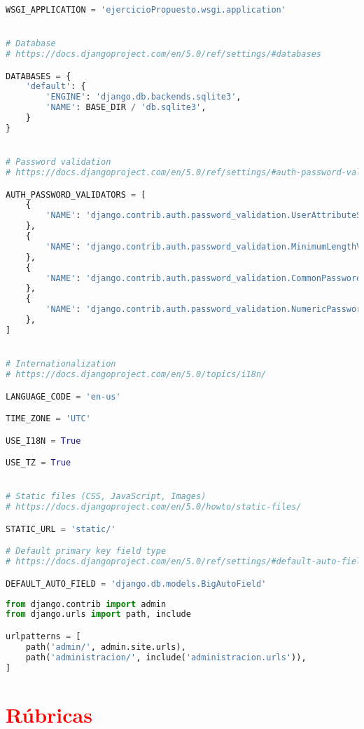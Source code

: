 \documentclass{article}
\begin{document}
\begin{lstlisting}[language=Python, caption=settings.py]
WSGI_APPLICATION = 'ejercicioPropuesto.wsgi.application'


# Database
# https://docs.djangoproject.com/en/5.0/ref/settings/#databases

DATABASES = {
    'default': {
        'ENGINE': 'django.db.backends.sqlite3',
        'NAME': BASE_DIR / 'db.sqlite3',
    }
}


# Password validation
# https://docs.djangoproject.com/en/5.0/ref/settings/#auth-password-validators

AUTH_PASSWORD_VALIDATORS = [
    {
        'NAME': 'django.contrib.auth.password_validation.UserAttributeSimilarityValidator',
    },
    {
        'NAME': 'django.contrib.auth.password_validation.MinimumLengthValidator',
    },
    {
        'NAME': 'django.contrib.auth.password_validation.CommonPasswordValidator',
    },
    {
        'NAME': 'django.contrib.auth.password_validation.NumericPasswordValidator',
    },
]


# Internationalization
# https://docs.djangoproject.com/en/5.0/topics/i18n/

LANGUAGE_CODE = 'en-us'

TIME_ZONE = 'UTC'

USE_I18N = True

USE_TZ = True


# Static files (CSS, JavaScript, Images)
# https://docs.djangoproject.com/en/5.0/howto/static-files/

STATIC_URL = 'static/'

# Default primary key field type
# https://docs.djangoproject.com/en/5.0/ref/settings/#default-auto-field

DEFAULT_AUTO_FIELD = 'django.db.models.BigAutoField'

        \end{lstlisting} 

        \begin{lstlisting}[language=Python, caption=urls.py]
from django.contrib import admin
from django.urls import path, include

urlpatterns = [
    path('admin/', admin.site.urls),
    path('administracion/', include('administracion.urls')),
]

        \end{lstlisting} 

    \clearpage

	\section{\textcolor{red}{Rúbricas}}
	
\end{document}

